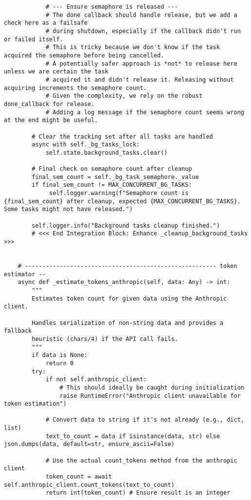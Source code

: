 \documentclass[12pt,a4paper]{article}
\begin{document}
\begin{pageablecode}
\begin{verbatim}
            # --- Ensure semaphore is released ---
            # The done callback should handle release, but we add a check here as a failsafe
            # during shutdown, especially if the callback didn't run or failed itself.
            # This is tricky because we don't know if the task acquired the semaphore before being cancelled.
            # A potentially safer approach is *not* to release here unless we are certain the task
            # acquired it and didn't release it. Releasing without acquiring increments the semaphore count.
            # Given the complexity, we rely on the robust done_callback for release.
            # Adding a log message if the semaphore count seems wrong at the end might be useful.

        # Clear the tracking set after all tasks are handled
        async with self._bg_tasks_lock:
            self.state.background_tasks.clear()

        # Final check on semaphore count after cleanup
        final_sem_count = self._bg_task_semaphore._value
        if final_sem_count != MAX_CONCURRENT_BG_TASKS:
             self.logger.warning(f"Semaphore count is {final_sem_count} after cleanup, expected {MAX_CONCURRENT_BG_TASKS}. Some tasks might not have released.")

        self.logger.info("Background tasks cleanup finished.")
        # <<< End Integration Block: Enhance _cleanup_background_tasks >>>


    # ------------------------------------------------------- token estimator --
    async def _estimate_tokens_anthropic(self, data: Any) -> int:
        """
        Estimates token count for given data using the Anthropic client.

        Handles serialization of non-string data and provides a fallback
        heuristic (chars/4) if the API call fails.
        """
        if data is None:
            return 0
        try:
            if not self.anthropic_client:
                # This should ideally be caught during initialization
                raise RuntimeError("Anthropic client unavailable for token estimation")

            # Convert data to string if it's not already (e.g., dict, list)
            text_to_count = data if isinstance(data, str) else json.dumps(data, default=str, ensure_ascii=False)

            # Use the actual count_tokens method from the anthropic client
            token_count = await self.anthropic_client.count_tokens(text_to_count)
            return int(token_count) # Ensure result is an integer


\end{verbatim}
\end{pageablecode}
\end{document}
